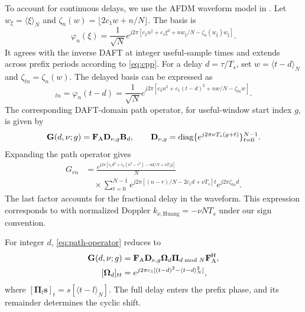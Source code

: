 To account for continuous delays, we use the AFDM waveform model in
\cite[Sec.~II]{huang2026}. Let $w_\xi=\langle\xi\rangle_N$ and
$\zeta_n(w)=\lfloor2c_1w+n/N\rfloor$. The basis is
\begin{equation}
 \varphi_n(\xi)=\frac{1}{\sqrt N}
 e^{j2\pi[c_2n^2+c_1\xi^2+nw_\xi/N-\zeta_n(w_\xi)w_\xi]}.
 \label{eq:continuous-waveform}
\end{equation}
It agrees with the inverse DAFT at integer useful-sample times and
extends across prefix periods according to \eqref{eq:cpp}.
For a delay $d=\tau/T_s$, set $w=\langle t-d\rangle_N$ and
$\zeta_{tn}=\zeta_n(w)$. The delayed basis can be expressed as
\begin{equation}
 [\mathbf B_d]_{tn}=\varphi_n(t-d)
 =\frac{1}{\sqrt N}
 e^{j2\pi[c_2n^2+c_1(t-d)^2+nw/N-\zeta_{tn}w]}.
 \label{eq:continuous-basis}
\end{equation}
The corresponding DAFT-domain path operator, for useful-window start
index $g$, is given by
\begin{equation}
 \mathbf G(d,\nu;g)=\mathbf F_{\rm A}\mathbf D_{\nu,g}\mathbf B_d,
 \qquad
 \mathbf D_{\nu,g}=\operatorname{diag}\{e^{j2\pi\nu T_s(g+t)}\}_{t=0}^{N-1}.
 \label{eq:path-operator}
\end{equation}
Expanding the path operator gives
\begin{equation}
 \begin{split}
 G_{rn}
 &=\frac{e^{j2\pi[c_1d^2+c_2(n^2-r^2)-nd/N+\nu T_sg]}}{N}\\
 &\quad\times\sum_{t=0}^{N-1}
 e^{j2\pi[(n-r)/N-2c_1d+\nu T_s]t}
 e^{j2\pi\zeta_{tn}d}.
 \end{split}
 \label{eq:path-entry-expansion}
\end{equation}
The last factor accounts for the fractional delay in the waveform.
This expression corresponds to \cite[eq.~(5)]{huang2026} with normalized
Doppler $k_{\nu,\mathrm{Huang}}=-\nu NT_s$ under our sign convention.

For integer $d$, \eqref{eq:path-operator} reduces to
\begin{align}
 \mathbf G(d,\nu;g)
 &=\mathbf F_{\rm A}\mathbf D_{\nu,g}\bm\Omega_d
   \bm\Pi_{d\bmod N}\mathbf F_{\rm A}^{\mathsf H},
 \label{eq:integer-operator}\\
 [\bm\Omega_d]_{tt}
 &=e^{j2\pi c_1[(t-d)^2-\langle t-d\rangle_N^2]},
 \label{eq:integer-prefix-phase}
\end{align}
where $[\bm\Pi_l\mathbf s]_t=s[\langle t-l\rangle_N]$.
The full delay enters the prefix phase, and its remainder determines
the cyclic shift.

